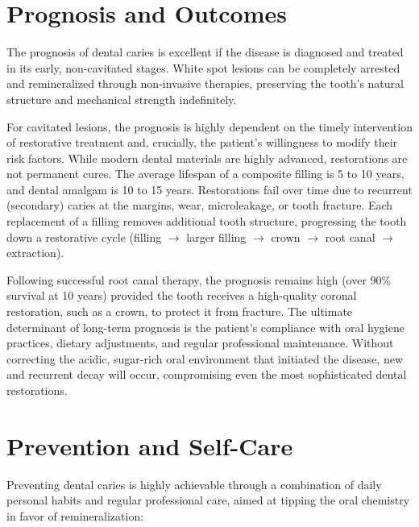 \section*{Prognosis and Outcomes}
The prognosis of dental caries is excellent if the disease is diagnosed and treated in its early, non-cavitated stages. White spot lesions can be completely arrested and remineralized through non-invasive therapies, preserving the tooth's natural structure and mechanical strength indefinitely.

For cavitated lesions, the prognosis is highly dependent on the timely intervention of restorative treatment and, crucially, the patient's willingness to modify their risk factors. While modern dental materials are highly advanced, restorations are not permanent cures. The average lifespan of a composite filling is 5 to 10 years, and dental amalgam is 10 to 15 years. Restorations fail over time due to recurrent (secondary) caries at the margins, wear, microleakage, or tooth fracture. Each replacement of a filling removes additional tooth structure, progressing the tooth down a restorative cycle (filling $\rightarrow$ larger filling $\rightarrow$ crown $\rightarrow$ root canal $\rightarrow$ extraction).

Following successful root canal therapy, the prognosis remains high (over 90\% survival at 10 years) provided the tooth receives a high-quality coronal restoration, such as a crown, to protect it from fracture. The ultimate determinant of long-term prognosis is the patient's compliance with oral hygiene practices, dietary adjustments, and regular professional maintenance. Without correcting the acidic, sugar-rich oral environment that initiated the disease, new and recurrent decay will occur, compromising even the most sophisticated dental restorations.

\section*{Prevention and Self-Care}
Preventing dental caries is highly achievable through a combination of daily personal habits and regular professional care, aimed at tipping the oral chemistry in favor of remineralization:

